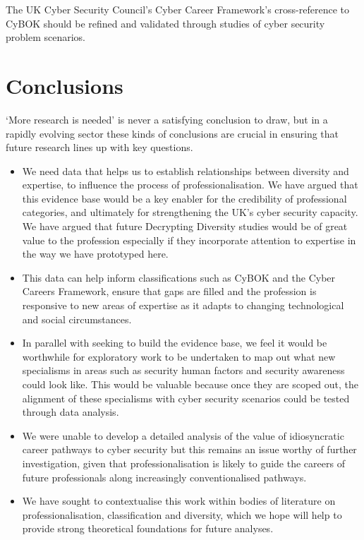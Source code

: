 \documentclass[
  a4paper,
]{book}
\begin{document}
The UK Cyber Security Council's Cyber Career Framework's cross-reference
to CyBOK should be refined and validated through studies of cyber
security problem scenarios.


\chapter{Conclusions}\label{conclusions}

`More research is needed' is never a satisfying conclusion to draw, but
in a rapidly evolving sector these kinds of conclusions are crucial in
ensuring that future research lines up with key questions.

\begin{itemize}
\item
  We need data that helps us to establish relationships between
  diversity and expertise, to influence the process of
  professionalisation. We have argued that this evidence base would be a
  key enabler for the credibility of professional categories, and
  ultimately for strengthening the UK's cyber security capacity. We have
  argued that future Decrypting Diversity studies would be of great
  value to the profession especially if they incorporate attention to
  expertise in the way we have prototyped here.
\item
  This data can help inform classifications such as CyBOK and the Cyber
  Careers Framework, ensure that gaps are filled and the profession is
  responsive to new areas of expertise as it adapts to changing
  technological and social circumstances.
\item
  In parallel with seeking to build the evidence base, we feel it would
  be worthwhile for exploratory work to be undertaken to map out what
  new specialisms in areas such as security human factors and security
  awareness could look like. This would be valuable because once they
  are scoped out, the alignment of these specialisms with cyber security
  scenarios could be tested through data analysis.
\item
  We were unable to develop a detailed analysis of the value of
  idiosyncratic career pathways to cyber security but this remains an
  issue worthy of further investigation, given that professionalisation
  is likely to guide the careers of future professionals along
  increasingly conventionalised pathways.
\item
  We have sought to contextualise this work within bodies of literature
  on professionalisation, classification and diversity, which we hope
  will help to provide strong theoretical foundations for future
  analyses.
\end{itemize}
\end{document}
